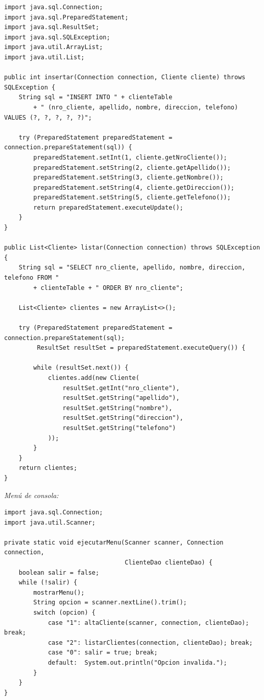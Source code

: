 \documentclass[11pt,a4paper]{article}
\begin{document}
\begin{lstlisting}
import java.sql.Connection;
import java.sql.PreparedStatement;
import java.sql.ResultSet;
import java.sql.SQLException;
import java.util.ArrayList;
import java.util.List;

public int insertar(Connection connection, Cliente cliente) throws SQLException {
    String sql = "INSERT INTO " + clienteTable
        + " (nro_cliente, apellido, nombre, direccion, telefono) VALUES (?, ?, ?, ?, ?)";

    try (PreparedStatement preparedStatement = connection.prepareStatement(sql)) {
        preparedStatement.setInt(1, cliente.getNroCliente());
        preparedStatement.setString(2, cliente.getApellido());
        preparedStatement.setString(3, cliente.getNombre());
        preparedStatement.setString(4, cliente.getDireccion());
        preparedStatement.setString(5, cliente.getTelefono());
        return preparedStatement.executeUpdate();
    }
}

public List<Cliente> listar(Connection connection) throws SQLException {
    String sql = "SELECT nro_cliente, apellido, nombre, direccion, telefono FROM "
        + clienteTable + " ORDER BY nro_cliente";

    List<Cliente> clientes = new ArrayList<>();

    try (PreparedStatement preparedStatement = connection.prepareStatement(sql);
         ResultSet resultSet = preparedStatement.executeQuery()) {

        while (resultSet.next()) {
            clientes.add(new Cliente(
                resultSet.getInt("nro_cliente"),
                resultSet.getString("apellido"),
                resultSet.getString("nombre"),
                resultSet.getString("direccion"),
                resultSet.getString("telefono")
            ));
        }
    }
    return clientes;
}
\end{lstlisting}

\textit{Menú de consola:}

\begin{lstlisting}
import java.sql.Connection;
import java.util.Scanner;

private static void ejecutarMenu(Scanner scanner, Connection connection,
                                 ClienteDao clienteDao) {
    boolean salir = false;
    while (!salir) {
        mostrarMenu();
        String opcion = scanner.nextLine().trim();
        switch (opcion) {
            case "1": altaCliente(scanner, connection, clienteDao); break;
            case "2": listarClientes(connection, clienteDao); break;
            case "0": salir = true; break;
            default:  System.out.println("Opcion invalida.");
        }
    }
}
\end{lstlisting}
\end{document}

